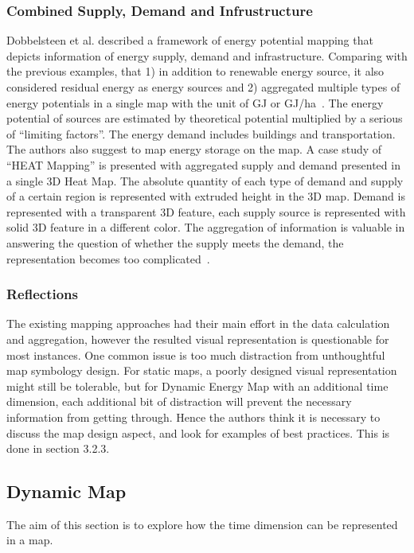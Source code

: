\documentclass[hidelinks,12pt]{article}
\begin{document}
\subsubsection{Combined Supply, Demand and Infrustructure}
Dobbelsteen et al. described a framework of energy potential mapping
that depicts information of energy supply, demand and infrastructure.
Comparing with the previous examples, that 1) in addition to renewable
energy source, it also considered residual energy as energy sources
and 2) aggregated multiple types of energy potentials in a single map
with the unit of GJ or GJ/ha~\cite{Dobbelsteen2013}. The energy
potential of sources are estimated by theoretical potential multiplied
by a serious of ``limiting factors''. The energy demand includes
buildings and transportation. The authors also suggest to map energy
storage on the map. A case study of ``HEAT Mapping'' is presented with
aggregated supply and demand presented in a single 3D Heat Map. The
absolute quantity of each type of demand and supply of a certain
region is represented with extruded height in the 3D map. Demand is
represented with a transparent 3D feature, each supply source is
represented with solid 3D feature in a different color. The
aggregation of information is valuable in answering the question of
whether the supply meets the demand, the representation becomes too
complicated~\cite{Dobbelsteen2013}.

\subsubsection{Reflections}\label{Reflection}
The existing mapping approaches had their main effort in the data
calculation and aggregation, however the resulted visual
representation is questionable for most instances. One common issue is
too much distraction from unthoughtful map symbology design. For
static maps, a poorly designed visual representation might still be
tolerable, but for Dynamic Energy Map with an additional time
dimension, each additional bit of distraction will prevent the
necessary information from getting through. Hence the authors think it
is necessary to discuss the map design aspect, and look for examples
of best practices. This is done in section 3.2.3.

\subsection{Dynamic Map}
The aim of this section is to explore how the time dimension can be
represented in a map.
\end{document}
